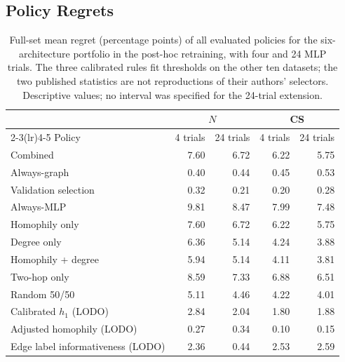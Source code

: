 \subsection{Policy Regrets}

\begin{table}[ht]
\centering
\caption{Full-set mean regret (percentage points) of all evaluated policies for the six-architecture portfolio in the post-hoc retraining, with four and 24 MLP trials. The three calibrated rules fit thresholds on the other ten datasets; the two published statistics are not reproductions of their authors' selectors. Descriptive values; no interval was specified for the 24-trial extension.}
\label{tab:mlp_budget_policies}
\small
\begin{tabular}{@{}lrrrr@{}}
\toprule
 & \multicolumn{2}{c}{$N$} & \multicolumn{2}{c}{CS} \\
\cmidrule(lr){2-3}\cmidrule(lr){4-5}
Policy & 4 trials & 24 trials & 4 trials & 24 trials \\
\midrule
Combined & 7.60 & 6.72 & 6.22 & 5.75 \\
Always-graph & 0.40 & 0.44 & 0.45 & 0.53 \\
Validation selection & 0.32 & 0.21 & 0.20 & 0.28 \\
Always-MLP & 9.81 & 8.47 & 7.99 & 7.48 \\
Homophily only & 7.60 & 6.72 & 6.22 & 5.75 \\
Degree only & 6.36 & 5.14 & 4.24 & 3.88 \\
Homophily + degree & 5.94 & 5.14 & 4.11 & 3.81 \\
Two-hop only & 8.59 & 7.33 & 6.88 & 6.51 \\
Random 50/50 & 5.11 & 4.46 & 4.22 & 4.01 \\
\midrule
Calibrated $h_1$ (LODO) & 2.84 & 2.04 & 1.80 & 1.88 \\
Adjusted homophily (LODO) & 0.27 & 0.34 & 0.10 & 0.15 \\
Edge label informativeness (LODO) & 2.36 & 0.44 & 2.53 & 2.59 \\
\bottomrule
\end{tabular}
\end{table}

